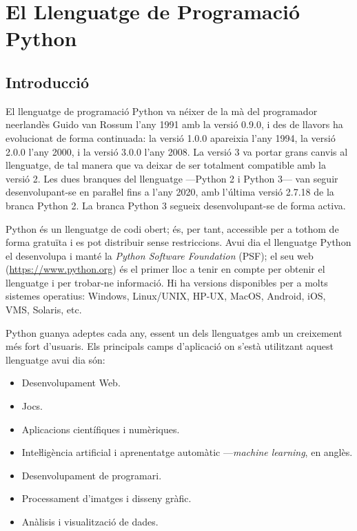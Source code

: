 \chapter{El Llenguatge de Programació Python}\label{chap:python-llenguatge}


\section{Introducció}

El llenguatge de programació Python va néixer de la mà del programador neerlandès Guido van Rossum l'any 1991 amb la versió 0.9.0, i des de llavors  ha evolucionat de forma continuada: la versió 1.0.0 apareixia l'any 1994, la versió 2.0.0 l'any 2000, i la versió 3.0.0 l'any 2008. La versió 3 va portar grans canvis al llenguatge, de tal manera que va deixar de ser totalment compatible amb la versió 2. Les dues branques del llenguatge ---Python 2 i Python 3--- van seguir desenvolupant-se en paraŀlel fins a l'any 2020, amb l'última versió  2.7.18  de la branca Python 2. La branca Python 3 segueix desenvolupant-se de forma activa.


Python és un llenguatge de codi obert; és, per tant, accessible per a tothom de forma gratuïta i  es pot distribuir sense restriccions.  Avui  dia el llenguatge Python el desenvolupa i manté la \textit{Python Software Foundation} (PSF); el seu web (\href{https://www.python.org/}{https://www.python.org}) és el primer lloc a tenir en compte per obtenir el llenguatge i per trobar-ne informació. Hi ha versions disponibles per a molts sistemes operatius: Windows, Linux/UNIX, HP-UX, MacOS, Android, iOS, VMS, Solaris, etc.

Python guanya adeptes cada any, essent un dels llenguatges amb un creixement més fort d'usuaris. Els principals camps d'aplicació on s'està utilitzant aquest llenguatge avui dia són:
\begin{itemize}
	\item Desenvolupament Web.
	\item Jocs.
	\item Aplicacions científiques i numèriques.
	\item Inteŀligència artificial i aprenentatge automàtic ---\textit{machine learning}, en anglès.
	\item Desenvolupament de programari.
	\item Processament d'imatges i disseny gràfic.
	\item Anàlisis i visualització de dades.
\end{itemize}


